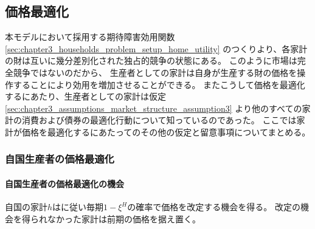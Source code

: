 
\subsection{価格最適化}
\label{sec:chapter3_assumptions_producer_optimization}
本モデルにおいて採用する期待障害効用関数
\eqref{sec:chapter3_households_problem_setup_home_utility}
のつくりより、各家計の財は互いに幾分差別化された独占的競争の状態にある。
このように市場は完全競争ではないのだから、
生産者としての家計は自身が生産する財の価格を操作することにより効用を増加させることができる。
またこうして価格を最適化するにあたり、生産者としての家計は仮定
\eqref{sec:chapter3_assumptions_market_structure_assumption3}
より他のすべての家計の消費および債券の最適化行動について知っているのであった。
ここでは家計が価格を最適化するにあたってのその他の仮定と留意事項についてまとめる。

\subsubsection{自国生産者の価格最適化}
\label{sec:chapter3_assumptions_producer_optimization_home}

\paragraph{自国生産者の価格最適化の機会}
\label{sec:chapter3_assumptions_producer_optimization_home_opportunity}
自国の家計\(h\)は\textcite{Calvo1983}に従い毎期\(1-\xi^H\)の確率で価格を改定する機会を得る。
改定の機会を得られなかった家計は前期の価格を据え置く。

